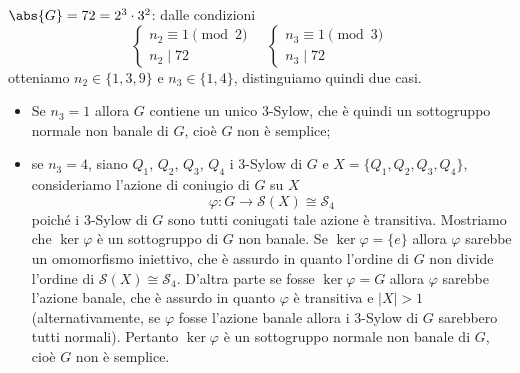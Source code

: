 \documentclass[11pt]{scrartcl}
\begin{document}
	\underline{$\abs{G} = 72 = 2^3 \cdot 3^2$}: dalle condizioni 
	\[
	\begin{cases}
		n_2 \equiv 1 \pmod 2\\
		n_2 \mid 72
	\end{cases}\quad
	\begin{cases}
		n_3 \equiv 1 \pmod 3\\
		n_3 \mid 72
	\end{cases}
	\]
	otteniamo $n_2 \in \{1, 3, 9\}$ e $n_3 \in \{1, 4\}$, distinguiamo quindi
	due casi.
	\begin{itemize}
		\item Se $n_3 = 1$ allora $G$ contiene un unico 3-Sylow, che è quindi un
		sottogruppo normale non banale di $G$, cioè $G$ non è semplice;
		\item se $n_3= 4$, siano $Q_1$, $Q_2$, $Q_3$, $Q_4$ i 3-Sylow di $G$ e 
		$X = \{Q_1, Q_2, Q_3, Q_4\}$, consideriamo l'azione di coniugio di $G$ su $X$
		\[
		\varphi: G\longrightarrow \mathcal{S}(X) \cong \mathcal{S}_4
		\]
		poiché i 3-Sylow di $G$ sono tutti coniugati tale azione è transitiva.
		Mostriamo che $\ker \varphi$ è un sottogruppo di $G$ non banale. Se $\ker\varphi
		= \{e\}$ allora $\varphi$ sarebbe un omomorfismo iniettivo, che è assurdo
		in quanto l'ordine di $G$ non divide l'ordine di $\mathcal{S}(X) \cong \mathcal{S}_4$. D'altra
		parte se fosse $\ker\varphi = G$ allora $\varphi$ sarebbe l'azione banale,
		che è assurdo in quanto $\varphi$ è transitiva e $|X| > 1$ (alternativamente,
		se $\varphi$ fosse l'azione banale allora i 3-Sylow di $G$ sarebbero tutti
		normali). Pertanto $\ker\varphi$ è un sottogruppo normale non banale di $G$,
		cioè $G$ non è semplice.
	\end{itemize}
	
\end{document}
